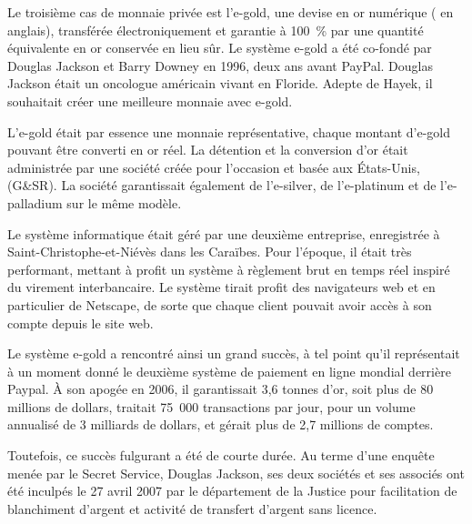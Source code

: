 
Le troisième cas de monnaie privée est l'e-gold, une devise en or numérique ( en anglais), transférée électroniquement et garantie à 100~\% par une quantité équivalente en or conservée en lieu sûr. Le système e-gold a été co-fondé par Douglas Jackson et Barry Downey en 1996, deux ans avant PayPal. Douglas Jackson était un oncologue américain vivant en Floride. Adepte de Hayek, il souhaitait créer une meilleure monnaie avec e-gold.


L'e-gold était par essence une monnaie représentative, chaque montant d'e-gold pouvant être converti en or réel. La détention et la conversion d'or était administrée par une société créée pour l'occasion et basée aux États-Unis,  (G\&SR). La société garantissait également de l'e-silver, de l'e-platinum et de l'e-palladium sur le même modèle.

Le système informatique était géré par une deuxième entreprise,  enregistrée à Saint-Christophe-et-Niévès dans les Caraïbes. Pour l'époque, il était très performant, mettant à profit un système à règlement brut en temps réel inspiré du virement interbancaire. Le système tirait profit des navigateurs web et en particulier de Netscape, de sorte que chaque client pouvait avoir accès à son compte depuis le site web.

Le système e-gold a rencontré ainsi un grand succès, à tel point qu'il représentait à un moment donné le deuxième système de paiement en ligne mondial derrière Paypal. À son apogée en 2006, il garantissait 3,6 tonnes d'or, soit plus de 80 millions de dollars, traitait 75~000 transactions par jour, pour un volume annualisé de 3 milliards de dollars, et gérait plus de 2,7 millions de comptes.

Toutefois, ce succès fulgurant a été de courte durée. Au terme d'une enquête menée par le Secret Service, Douglas Jackson, ses deux sociétés et ses associés ont été inculpés le 27 avril 2007 par le département de la Justice pour facilitation de blanchiment d'argent et activité de transfert d'argent sans licence.

